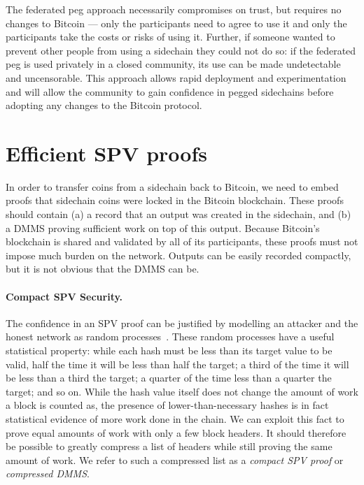 \documentclass[letterpaper]{article}
\newcommand{\sidechain}{sidechain\xspace}
\newcommand{\hashsig}{DMMS\xspace}
\begin{document}
\begin{appendices}
The federated peg approach necessarily compromises on trust, but requires no changes
to Bitcoin --- only the participants need to agree to use it and only the participants
take the costs or risks of using it. Further, if someone wanted to prevent other
people from using a sidechain they could not do so: if the federated peg is used
privately in a closed community, its use can be made undetectable and uncensorable.
This approach allows rapid deployment and experimentation and will allow the
community to gain confidence in pegged sidechains before adopting any changes to the Bitcoin protocol.


\section{Efficient SPV proofs\label{compactspv}}

In order to transfer coins from a \sidechain back to Bitcoin, we need to
embed proofs that \sidechain coins were locked in the Bitcoin blockchain.
These proofs should contain (a) a record that an output was created in the
\sidechain, and (b) a \hashsig proving sufficient work on top of this output.
Because Bitcoin's blockchain is shared and validated by all of its participants,
these proofs must not impose much burden on the network.
Outputs can be easily recorded compactly,
but it is not obvious that the \hashsig can be.

\paragraph{Compact SPV Security.} The confidence in an SPV proof can be justified
by modelling an attacker and the honest network as random processes~\cite{miller+laviola2014}.
These random processes have a useful statistical property: while each hash
must be less than its target value to be valid, half the time it will be less than half the target;
a third of the time it will be less than a third the target; a quarter of the time less than
a quarter the target; and so on. While the hash value itself does not change the amount of work
a block is counted as, the presence of lower-than-necessary hashes is in fact statistical evidence
of more work done in the chain\cite{miller2012}.
We can exploit this fact to prove equal amounts of work with only a few block
headers\cite{friedenbach2014}. It should therefore be possible to greatly
compress a list of headers while still proving the same amount of work. We
refer to such a compressed list as a \emph{compact SPV proof} or
\emph{compressed \hashsig}.


\end{appendices}
\end{document}
